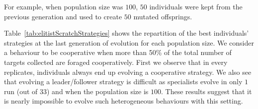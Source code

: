       For example, when population size was $100$, $50$ individuals were kept from the previous generation and used to create $50$ mutated offsprings.

      \begin{table}[hbtp]
        \caption{\textbf{Strategies evolved by the best individuals under elitist selection with an initially random population.} Repartition of the different strategies adopted by the best individuals at the last evaluation in each of the replicates for different population sizes \(N\). We indicate in each cell the number of simulations where a particular strategy evolved. Populations were evolved under an \((\mu + \lambda)\) elitist selection, with \(\mu = \frac{N}{2}\) and \(\lambda = \frac{N}{2}\). Individuals' genotype values were intially random. In the table "L/F" stands for leader/follower and "NC" for "Non-Cooperative".}
        \label{tab:elitistScratchStrategies}
      \end{table}

      Table~\ref{tab:elitistScratchStrategies} shows the repartition of the best individuals' strategies at the last generation of evolution for each population size. We consider a behaviour to be cooperative when more than 50\% of the total number of targets collected are foraged cooperatively. First we observe that in every replicates, individuals always end up evolving a cooperative strategy. We also see that evolving a leader/follower strategy is difficult as specialists evolve in only $1$ run (out of $33$) and when the population size is $100$. These results suggest that it is nearly impossible to evolve such heterogeneous behaviours with this setting.

